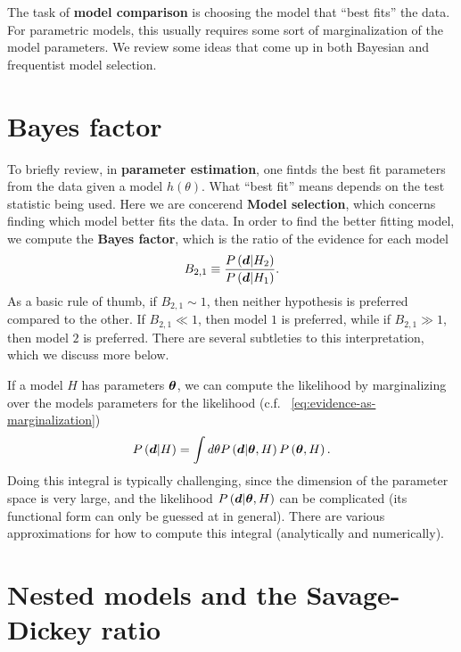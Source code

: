 The task of \textbf{model comparison} is choosing the model that ``best fits'' the data.
For parametric models, this usually requires some sort of marginalization of the model parameters.
We review some ideas that come up in both Bayesian and frequentist model selection.

\section{Bayes factor}


To briefly review, in \textbf{parameter estimation}, 
one fintds the best fit parameters from the data given a model $h\left(\theta\right)$.
What ``best fit'' means depends on the test statistic being used. 
Here we are concerend \textbf{Model selection}, which concerns finding which
model better fits the data.
In order to find the better fitting model, we compute the \textbf{Bayes factor},
which is the ratio of the evidence for each model 
\begin{align}
    \label{eq:def-Bayes-factor}
    B_{2,1}
    \equiv
    \frac{P\left({\bm d}|H_2\right)}{P\left({\bm d}|H_1\right)}
    .
\end{align}
As a basic rule of thumb, if $B_{2,1}\sim1$, then neither hypothesis is preferred
compared to the other.
If $B_{2,1}\ll1$, then model $1$ is preferred, while if $B_{2,1}\gg1$, then model $2$ is preferred.
There are several subtleties to this interpretation, which we discuss more below.

If a model $H$ has parameters ${\bm \theta}$, we can compute the likelihood 
by marginalizing over the models parameters for the likelihood
(c.f. ~\eqref{eq:evidence-as-marginalization})
\begin{align}
    P\left({\bm d}|H\right)
    =
    \int d\theta P\left({\bm d}|{\bm \theta},H\right) P\left({\bm \theta},H\right)
    .
\end{align}
Doing this integral is typically challenging, since the dimension of the
parameter space is very large, and the likelihood $P\left({\bm d}|{\bm \theta},H\right)$
can be complicated (its functional form can only be guessed at in general).
There are various approximations for how to 
compute this integral (analytically and numerically).

\section{Nested models and the Savage-Dickey ratio}

